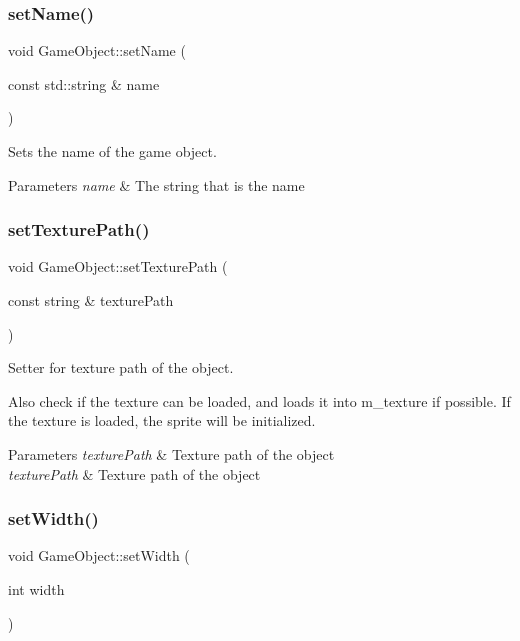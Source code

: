 \subsubsection{\texorpdfstring{set\+Name()}{setName()}}
{\footnotesize\ttfamily void Game\+Object\+::set\+Name (\begin{DoxyParamCaption}\item[{const std\+::string \&}]{name }\end{DoxyParamCaption})}



Sets the name of the game object. 


\begin{DoxyParams}{Parameters}
{\em name} & The string that is the name \\
\hline
\end{DoxyParams}
\mbox{\label{classGameObject_a0d9759f01e8098149ce3e69cb8878534}} 
\subsubsection{\texorpdfstring{set\+Texture\+Path()}{setTexturePath()}}
{\footnotesize\ttfamily void Game\+Object\+::set\+Texture\+Path (\begin{DoxyParamCaption}\item[{const string \&}]{texture\+Path }\end{DoxyParamCaption})}



Setter for texture path of the object. 

Also check if the texture can be loaded, and loads it into m\+\_\+texture if possible. If the texture is loaded, the sprite will be initialized. 
\begin{DoxyParams}{Parameters}
{\em texture\+Path} & Texture path of the object\\
\hline
{\em texture\+Path} & Texture path of the object \\
\hline
\end{DoxyParams}
\mbox{\label{classGameObject_aea1d6398e4b66af6987c24e7728463ad}} 
\subsubsection{\texorpdfstring{set\+Width()}{setWidth()}}
{\footnotesize\ttfamily void Game\+Object\+::set\+Width (\begin{DoxyParamCaption}\item[{int}]{width }\end{DoxyParamCaption})}



